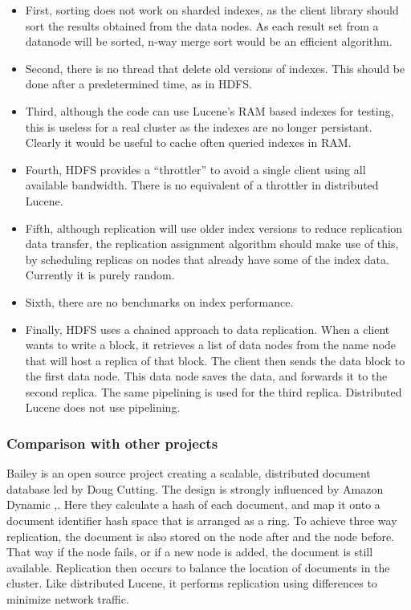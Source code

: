 \documentclass[a4paper,10pt]{article}
\begin{document}
\begin{itemize}
\item First, sorting does not work on sharded indexes, as the client library should sort the results obtained from the data nodes. As each result set from a datanode will be sorted, n-way merge sort would be an efficient algorithm.
\item Second, there is no thread that delete old versions of indexes. This should be done after a predetermined time, as in HDFS. 
\item Third, although the code can use Lucene's RAM based indexes for testing, this is useless for a real cluster as the indexes are no longer persistant. Clearly it would be useful to cache often queried indexes in RAM. 
\item Fourth, HDFS provides a ``throttler'' to avoid a single client using all available bandwidth. There is no equivalent of a throttler in distributed Lucene. 
\item Fifth, although replication will use older index versions to reduce replication data transfer, the replication assignment algorithm should make use of this, by scheduling replicas on nodes that already have some of the index data. Currently it is purely random. 
\item Sixth, there are no benchmarks on index performance. 
\item Finally, HDFS uses a chained approach to data replication. When a client wants to write a block, it retrieves a list of data nodes from the name node that will host a replica of that block. The client then sends the data block to the first data node. This data node saves the data, and forwards it to the second replica. The same pipelining is used for the third replica. Distributed Lucene does not use pipelining. 
\end{itemize}

\subsubsection{Comparison with other projects}

Bailey \cite{bailey} is an open source project creating a scalable, distributed document database led by Doug Cutting. The design is strongly influenced by Amazon Dynamic \cite{vogelBlog},\cite{dynamo}. Here they calculate a hash of each document, and map it onto a document identifier hash space that is arranged as a ring. To achieve three way replication, the document is also stored on the node after and the node before. That way if the node fails, or if a new node is added, the document is still available. Replication then occurs to balance the location of documents in the cluster. Like distributed Lucene, it performs replication using differences to minimize network traffic.
\end{document}
